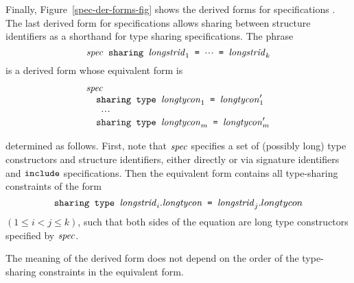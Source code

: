 Finally, Figure~\ref{spec-der-forms-fig} shows the derived forms for specifications .
The last derived form for specifications allows sharing between structure
identifiers as a shorthand for type sharing specifications.
The phrase
\[
\hbox{\tt ${\it spec}$ sharing ${\it longstrid}_1$ = $\mbox{$\cdot\!\cdot\!\cdot$}$ = ${\it longstrid}_k$}
\]
is a derived form whose equivalent form is
\[\begin{array}{l}
  \hbox{\tt ${\it spec}$}\cr
  \hbox{\tt \ \ sharing type ${\it longtycon}_{1}$ =  ${\it longtycon}_{1}'$}\cr
  \hbox{\tt \ \ \ $\mbox{$\cdot\!\cdot\!\cdot$}$}\cr
  \hbox{\tt \ \ sharing type ${\it longtycon}_{m}$ =  ${\it longtycon}_{m}'$}\cr
\end{array}\]

\noindent
determined as follows.
First, note that  ${\it spec}$  specifies a set of
(possibly long) type constructors and structure identifiers, either
directly or via signature identifiers and ${\tt include}$ specifications.
Then the equivalent form contains all type-sharing constraints
of the form
\[
\hbox{\tt sharing type ${\it longstrid}_i.{\it longtycon}$ = ${\it longstrid}_j.longtycon$}
\]
$(1\leq i<j\leq k)$,  such that both sides of the equation are long type
constructors specified by  ${\it spec}$.

The meaning of the derived form does not depend on the order of the
type-sharing constraints in the equivalent form.



